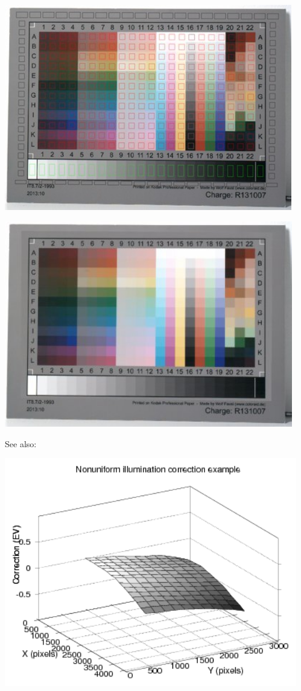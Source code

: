 \begin{center}
\includegraphics[height=9cm]{images/it8_lum_sampling_areas}
\end{center}

\begin{center}
\includegraphics[height=9cm]{images/it8_lum_correction}
\end{center}

See also:\\

\begin{center}
\includegraphics[height=10cm]{images/it8_lum_correction_3d}
\end{center}

